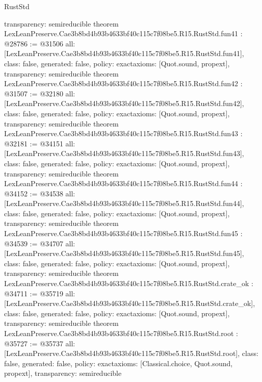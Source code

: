 \begin{lexlean}{RustStd}
\begin{coremodule}
{  transparency: semireducible
}
theorem LexLeanPreserve.Cae3b8bd4b93b4633bf40c115c7f08be5.R15.RustStd.fun41 : @28786 := @31506 {
  all: [LexLeanPreserve.Cae3b8bd4b93b4633bf40c115c7f08be5.R15.RustStd.fun41],
  class: false,
  generated: false,
  policy: exact{axioms: [Quot.sound, propext]},
  transparency: semireducible
}
theorem LexLeanPreserve.Cae3b8bd4b93b4633bf40c115c7f08be5.R15.RustStd.fun42 : @31507 := @32180 {
  all: [LexLeanPreserve.Cae3b8bd4b93b4633bf40c115c7f08be5.R15.RustStd.fun42],
  class: false,
  generated: false,
  policy: exact{axioms: [Quot.sound, propext]},
  transparency: semireducible
}
theorem LexLeanPreserve.Cae3b8bd4b93b4633bf40c115c7f08be5.R15.RustStd.fun43 : @32181 := @34151 {
  all: [LexLeanPreserve.Cae3b8bd4b93b4633bf40c115c7f08be5.R15.RustStd.fun43],
  class: false,
  generated: false,
  policy: exact{axioms: [Quot.sound, propext]},
  transparency: semireducible
}
theorem LexLeanPreserve.Cae3b8bd4b93b4633bf40c115c7f08be5.R15.RustStd.fun44 : @34152 := @34538 {
  all: [LexLeanPreserve.Cae3b8bd4b93b4633bf40c115c7f08be5.R15.RustStd.fun44],
  class: false,
  generated: false,
  policy: exact{axioms: [Quot.sound, propext]},
  transparency: semireducible
}
theorem LexLeanPreserve.Cae3b8bd4b93b4633bf40c115c7f08be5.R15.RustStd.fun45 : @34539 := @34707 {
  all: [LexLeanPreserve.Cae3b8bd4b93b4633bf40c115c7f08be5.R15.RustStd.fun45],
  class: false,
  generated: false,
  policy: exact{axioms: [Quot.sound, propext]},
  transparency: semireducible
}
theorem LexLeanPreserve.Cae3b8bd4b93b4633bf40c115c7f08be5.R15.RustStd.crate_ok : @34711 := @35719 {
  all: [LexLeanPreserve.Cae3b8bd4b93b4633bf40c115c7f08be5.R15.RustStd.crate_ok],
  class: false,
  generated: false,
  policy: exact{axioms: [Quot.sound, propext]},
  transparency: semireducible
}
theorem LexLeanPreserve.Cae3b8bd4b93b4633bf40c115c7f08be5.R15.RustStd.root : @35727 := @35737 {
  all: [LexLeanPreserve.Cae3b8bd4b93b4633bf40c115c7f08be5.R15.RustStd.root],
  class: false,
  generated: false,
  policy: exact{axioms: [Classical.choice, Quot.sound, propext]},
  transparency: semireducible
}


\end{coremodule}
\end{lexlean}
